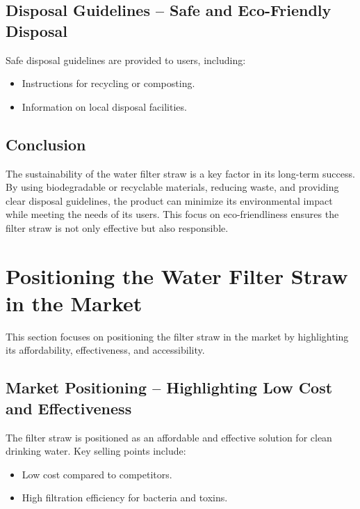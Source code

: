 \documentclass{article}
\begin{document}
\vspace{0.5cm}

\subsection{Disposal Guidelines – Safe and Eco-Friendly Disposal}
Safe disposal guidelines are provided to users, including:
\begin{itemize}
    \item Instructions for recycling or composting.
    \item Information on local disposal facilities.
\end{itemize}

\vspace{0.5cm}

\subsection*{Conclusion }
The sustainability of the water filter straw is a key factor in its long-term success. By using biodegradable or recyclable materials, reducing waste, and providing clear disposal guidelines, the product can minimize its environmental impact while meeting the needs of its users. This focus on eco-friendliness ensures the filter straw is not only effective but also responsible.


\newpage






\section{Positioning the Water Filter Straw in the Market}
This section focuses on positioning the filter straw in the market by highlighting its affordability, effectiveness, and accessibility.

\vspace{0.5cm}

\subsection{Market Positioning – Highlighting Low Cost and Effectiveness}
The filter straw is positioned as an affordable and effective solution for clean drinking water. Key selling points include:
\begin{itemize}
    \item Low cost compared to competitors.
    \item High filtration efficiency for bacteria and toxins.
\end{itemize}
\end{document}
